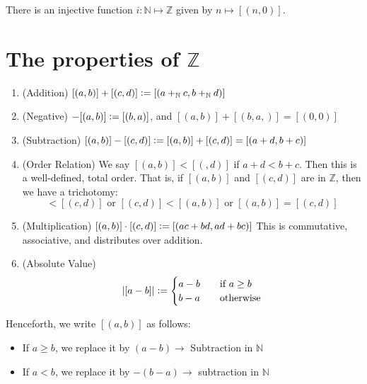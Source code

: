 \documentclass[12pt]{amsart}
\newcommand{\bbN}{\mathbb{N}}
\newcommand{\bbZ}{\mathbb{Z}}
\theoremstyle{plain}
\theoremstyle{remark}
\theoremstyle{definition}
\begin{document}
\par
There is an injective function $i:\bbN \mapsto \bbZ$ given by $n \mapsto [(n,0)]$.

\section*{The properties of $\bbZ$}
\begin{enumerate}[(1)]
	\item (Addition)
		$[(a,b)] + [(c,d)] \vcentcolon = [(a +_{\bbN} c, b +_{\bbN} d)]$ 
	\item (Negative)
		$-[(a,b)] \vcentcolon = [(b,a)]$, and $[(a,b)] + [(b,a,)] = [(0,0)]$
	\item (Subtraction)
		$[(a,b)] - [(c,d)] \vcentcolon = [(a,b)] + [(c,d)] = [(a+d,b+c)]$
	\item (Order Relation)
		We say $[(a,b)] < [(,d)]$ if $a + d < b + c$. Then this is a well-defined, total order. That is, if $[(a,b)]$ and $[(c,d)]$ are in $\bbZ$, then we have a trichotomy:
		\begin{equation*}
			[(a,b)] < [(c,d)] \mbox{ or } [(c,d)] < [(a,b)] \mbox{ or } [(a,b)] = [(c,d)]
		\end{equation*}

	\item (Multiplication)
		$[(a,b)] \cdot [(c,d)] \vcentcolon = [(ac+bd, ad + bc)]$
		\newline
		This is commutative, associative, and distributes over addition.
	\item (Absolute Value)
		\begin{equation*}
			|[a - b]| \vcentcolon = 
			\begin{cases}
				a - b \quad &\mbox{if } a \geq b\\
				b - a \quad &\mbox{otherwise}
			\end{cases}
		\end{equation*}
\end{enumerate}
Henceforth, we write $[(a,b)]$ as follows:
\begin{itemize}[-]
	\item
		If $a \geq b$, we replace it by $(a - b) \rightarrow$ Subtraction in $\bbN$
	\item
		If $a < b$, we replace it by $-(b - a ) \rightarrow$  subtraction in $\bbN$
\end{itemize}
\end{document}
